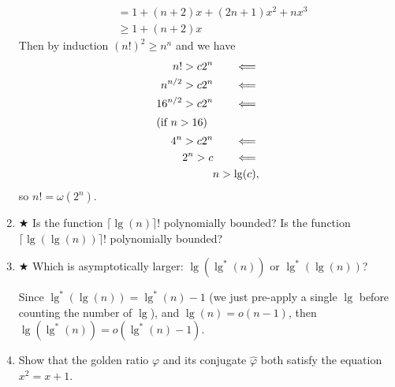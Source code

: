 \documentclass[Chapter03]{subfiles}
\begin{document}
\begin{enumerate}
\begin{answer}
\begin{align*}
					&= 1 + (n + 2)x + (2n + 1)x^2 + nx^3\\
					&\geq 1 + (n + 2)x
			\end{align*}
			Then by induction $(n!)^2 \geq n^n$ and we have 
			\begin{align*}
				n! > c2^n \tag*{$\impliedby$}\\
				n^{n/2} > c2^n \tag*{$\impliedby$}\\
				16^{n/2} > c2^n \tag*{$\impliedby$}\\
				\shortintertext{(if $n > 16$)}
				4^n > c2^n \tag*{$\impliedby$}\\
				2^n > c \tag*{$\impliedby$}\\
				n > \lg(c),
			\end{align*}
			so $n! = \omega(2^n)$.
		\end{answer}

		\item $\bigstar$ Is the function $\lceil \lg(n) \rceil !$ polynomially bounded? Is the function $\lceil \lg(\lg(n)) \rceil !$ polynomially bounded?
		\begin{answer}

		\end{answer}

		\item $\bigstar$ Which is asymptotically larger: $\lg(\lg^*(n))$ or $\lg^*(\lg(n))$?
		\begin{answer}
			Since $\lg^*(\lg(n)) = \lg^*(n) - 1$ (we just pre-apply a single $\lg$ before counting the number of $\lg$), and $\lg(n) = o(n - 1)$, then $\lg(\lg^*(n)) = o(\lg^*(n) - 1)$.
		\end{answer}

		\item Show that the golden ratio $\varphi$ and its conjugate $\hat\varphi$ both satisfy the equation $x^2 = x + 1$.
		\begin{answer}
			

\end{answer}
\end{enumerate}
\end{document}
